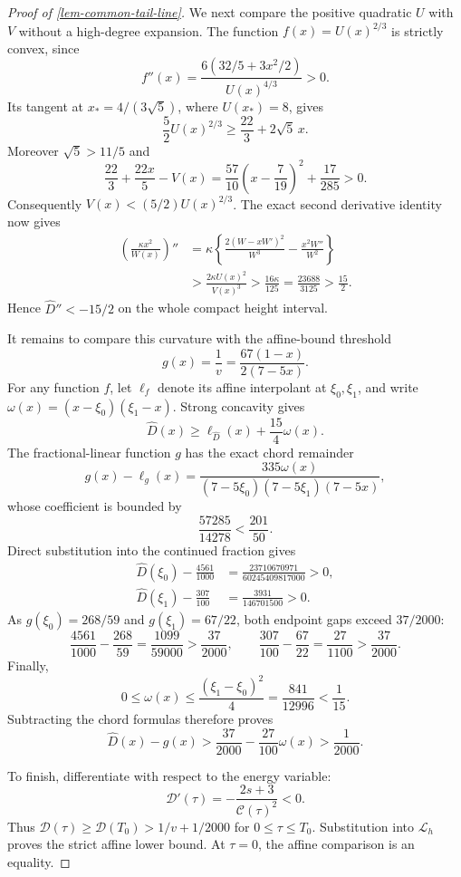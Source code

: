 \documentclass[11pt,a4paper]{article}
\theoremstyle{proofmanuscript}
\begin{document}
\begin{proof}[Proof of \ref{lem-common-tail-line}]
We next compare the positive quadratic \(U\) with \(V\) without a high-degree expansion. The function \(f(x)=U(x)^{2/3}\) is strictly convex, since \[
f''(x)=\frac{6(32/5+3x^2/2)}{U(x)^{4/3}}>0.
\] Its tangent at \(x_*=4/(3\sqrt5)\), where \(U(x_*)=8\), gives \[
\frac52 U(x)^{2/3}\ge\frac{22}{3}+2\sqrt5\,x.
\] Moreover \(\sqrt5>11/5\) and \[
\frac{22}{3}+\frac{22x}{5}-V(x)
=\frac{57}{10}\left(x-\frac7{19}\right)^2+\frac{17}{285}>0.
\] Consequently \(V(x)<(5/2)U(x)^{2/3}\). The exact second derivative identity now gives \[
\begin{aligned}
\left(\frac{\kappa x^2}{W(x)}\right)''
&=\kappa\left\{\frac{2(W-xW')^2}{W^3}-\frac{x^2W''}{W^2}\right\}\\
&>\frac{2\kappa U(x)^2}{V(x)^3}
>\frac{16\kappa}{125}
=\frac{23688}{3125}>\frac{15}{2}.
\end{aligned}
\] Hence \(\widehat D''<-15/2\) on the whole compact height interval.

It remains to compare this curvature with the affine-bound threshold \[
g(x)=\frac1v=\frac{67(1-x)}{2(7-5x)}.
\] For any function \(f\), let \(\ell_f\) denote its affine interpolant at \(\xi_0,\xi_1\), and write \(\omega(x)=(x-\xi_0)(\xi_1-x)\). Strong concavity gives \[
\widehat D(x)\ge\ell_{\widehat D}(x)+\frac{15}{4}\omega(x).
\] The fractional-linear function \(g\) has the exact chord remainder \[
g(x)-\ell_g(x)
=\frac{335\omega(x)}{(7-5\xi_0)(7-5\xi_1)(7-5x)},
\] whose coefficient is bounded by \[
\frac{57285}{14278}<\frac{201}{50}.
\] Direct substitution into the continued fraction gives \[
\begin{aligned}
\widehat D(\xi_0)-\frac{4561}{1000}
&=\frac{23710670971}{60245409817000}>0,\\
\widehat D(\xi_1)-\frac{307}{100}
&=\frac{3931}{146701500}>0.
\end{aligned}
\] As \(g(\xi_0)=268/59\) and \(g(\xi_1)=67/22\), both endpoint gaps exceed \(37/2000\): \[
\frac{4561}{1000}-\frac{268}{59}=\frac{1099}{59000}>\frac{37}{2000},\qquad
\frac{307}{100}-\frac{67}{22}=\frac{27}{1100}>\frac{37}{2000}.
\] Finally, \[
0\le\omega(x)\le\frac{(\xi_1-\xi_0)^2}{4}
=\frac{841}{12996}<\frac1{15}.
\] Subtracting the chord formulas therefore proves \[
\widehat D(x)-g(x)
>\frac{37}{2000}-\frac{27}{100}\omega(x)
>\frac1{2000}.
\]

To finish, differentiate with respect to the energy variable: \[
\mathcal D'(\tau)=-\frac{2s+3}{\mathcal C(\tau)^2}<0.
\] Thus \(\mathcal D(\tau)\ge\mathcal D(T_0)>1/v+1/2000\) for \(0\le\tau\le T_0\). Substitution into \(\mathcal L_h\) proves the strict affine lower bound. At \(\tau=0\), the affine comparison is an equality.

\end{proof}
\end{document}
